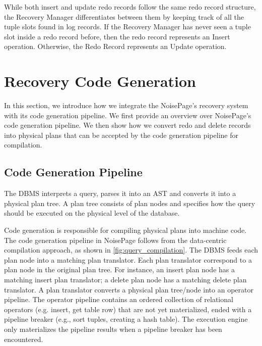 \documentclass[12pt]{cmuthesis}
\begin{document}
While both insert and update redo records follow the same redo record structure, the Recovery Manager differentiates between them by keeping track of all the tuple slots found in log records. If the Recovery Manager has never seen a tuple slot inside a redo record before, then the redo record represents an Insert operation. Otherwise, the Redo Record represents an Update operation.

\section{Recovery Code Generation}
In this section, we introduce how we integrate the NoisePage's recovery system with its code generation pipeline. We first provide an overview over NoisePage's code generation pipeline. We then show how we convert redo and delete records into physical plans that can be accepted by the code generation pipeline for compilation.

\subsection{Code Generation Pipeline}
The DBMS interprets a query, parses it into an AST and converts it into a physical plan tree. A plan tree consists of plan nodes and specifies how the query should be executed on the physical level of the database.

Code generation is responsible for compiling physical plans into machine code. The code generation pipeline in NoisePage follows from the data-centric compilation approach\cite{neumann11}, as shown in \cref{fig:query_compilation}. The DBMS feeds each plan node into a matching plan translator. Each plan translator correspond to a plan node in the original plan tree. For instance, an insert plan node has a matching insert plan translator; a delete plan node has a matching delete plan translator. A plan translator converts a physical plan tree/node into an operator pipeline. The operator pipeline contains an ordered collection of relational operators (e.g. insert, get table row) that are not yet materialized, ended with a pipeline breaker (e.g., sort tuples, creating a hash table). The execution engine only materializes the pipeline results when a pipeline breaker has been encountered.
\end{document}
